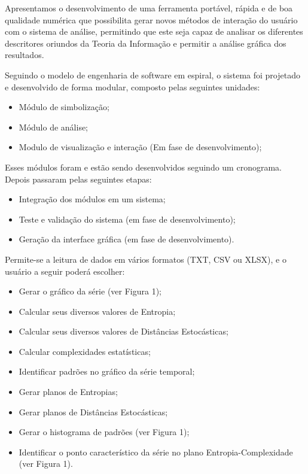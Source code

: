 
Apresentamos o desenvolvimento de uma ferramenta portável, rápida e de boa qualidade numérica que possibilita gerar novos métodos de interação do usuário com o sistema de análise, permitindo que este seja capaz de analisar os diferentes descritores oriundos da Teoria da Informação e permitir a análise gráfica dos resultados.

Seguindo o modelo de engenharia de software em espiral, o sistema foi projetado e desenvolvido de forma modular, composto pelas seguintes unidades:

\begin{itemize}
\item Módulo de simbolização;
\item Módulo de análise;
\item Modulo de visualização e interação (Em fase de desenvolvimento);
\end{itemize} 

Esses módulos foram e estão sendo desenvolvidos seguindo um cronograma. 
Depois passaram pelas seguintes etapas:

\begin{itemize}
\item Integração dos módulos em um sistema;
\item Teste e validação do sistema (em fase de desenvolvimento);
\item Geração da interface gráfica (em fase de desenvolvimento).
\end{itemize}

Permite-se a leitura de dados em vários formatos (TXT, CSV ou XLSX), e o usuário a seguir poderá escolher:

\begin{itemize}

	\item Gerar o gráfico da série (ver Figura 1);
	\item Calcular seus diversos valores de Entropia;
	\item Calcular seus diversos valores de Distâncias Estocásticas;
	\item Calcular complexidades estatísticas;
    \item Identificar padrões no gráfico da série temporal;
    \item Gerar planos de Entropias;
    \item Gerar planos de Distâncias Estocásticas;
	\item Gerar o histograma de padrões (ver Figura 1);
	\item Identificar o ponto característico da série no plano Entropia-Complexidade (ver Figura 1).

\end{itemize}

